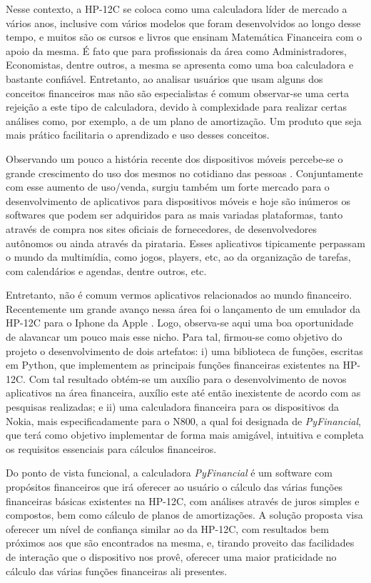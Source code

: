 Nesse contexto, a HP-12C \cite{hp12c} se coloca como uma calculadora líder de mercado a vários anos, inclusive com vários modelos que foram desenvolvidos ao longo desse tempo, e muitos são os cursos e livros que ensinam Matemática Financeira com o apoio da mesma. É fato que para profissionais da área como Administradores, Economistas, dentre outros, a mesma se apresenta como uma boa calculadora e bastante confiável. Entretanto, ao analisar usuários que usam alguns dos conceitos financeiros mas não são especialistas é comum observar-se uma certa rejeição a este tipo de calculadora, devido à complexidade para realizar certas análises como, por exemplo, a de um plano de amortização. Um produto que seja mais prático facilitaria o aprendizado e uso desses conceitos.

Observando um pouco a história recente dos dispositivos móveis percebe-se o grande crescimento do uso dos mesmos no cotidiano das pessoas \cite{celular}. Conjuntamente com esse aumento de uso/venda, surgiu também um forte mercado para o desenvolvimento de aplicativos para dispositivos móveis e hoje são inúmeros os softwares que podem ser adquiridos para as mais variadas plataformas, tanto através de compra nos sites oficiais de fornecedores, de desenvolvedores autônomos ou ainda através da pirataria. Esses aplicativos tipicamente perpassam o mundo da multimídia, como jogos, players, etc, ao da organização de tarefas, com calendários e agendas, dentre outros, etc.

Entretanto, não é comum vermos aplicativos relacionados ao mundo financeiro. Recentemente um grande avanço nessa área foi o lançamento de um emulador da HP-12C para o Iphone da Apple \cite{iphone}. Logo, observa-se aqui uma boa oportunidade de alavancar um pouco mais esse nicho. Para tal, firmou-se como objetivo do projeto o desenvolvimento de dois artefatos: i) uma biblioteca de funções, escritas em Python, que implementem as principais funções financeiras existentes na HP-12C. Com tal resultado obtém-se um auxílio para o desenvolvimento de novos aplicativos na área financeira, auxílio este até então inexistente de acordo com as pesquisas realizadas; e ii) uma calculadora financeira para os dispositivos da Nokia, mais especificadamente para o N800, a qual foi designada de \textit{PyFinancial}, que terá como objetivo implementar de forma mais amigável, intuitiva e completa os requisitos essenciais para cálculos financeiros. 

Do ponto de vista funcional, a calculadora \textit{PyFinancial} é um software com propósitos financeiros que irá oferecer ao usuário o cálculo das várias funções financeiras básicas existentes na HP-12C, com análises através de juros simples e compostos, bem como cálculo de planos de amortizações.  A solução proposta visa oferecer um nível de confiança similar ao da HP-12C, com resultados bem próximos aos que são encontrados na mesma, e, tirando proveito das facilidades de interação que o dispositivo nos provê, oferecer uma maior praticidade no cálculo das várias funções financeiras ali presentes.


